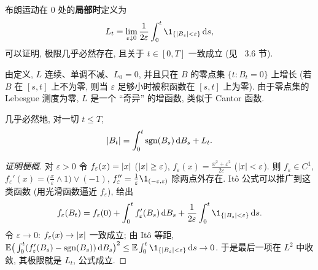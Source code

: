 \begin{definition}[局部时]\label{def:local-time}
布朗运动在 $0$ 处的\textbf{局部时}定义为
\[
L_t=\lim_{\varepsilon\downarrow0}\frac{1}{2\varepsilon}\int_0^t\1_{\{\abs{B_s}<\varepsilon\}}\dd s,
\]
可以证明, 极限几乎必然存在, 且关于 $t\in[0,T]$ 一致成立 (见~\cite{karatzas} 3.6 节).
\end{definition}

由定义, $L$ 连续、单调不减、$L_0=0$, 并且只在 $B$ 的零点集 $\{t: B_t=0\}$ 上增长 (若 $B$ 在 $[s,t]$ 上不为零, 则当 $\varepsilon$ 足够小时被积函数在 $[s,t]$ 上为零). 由于零点集的 Lebesgue 测度为零, $L$ 是一个 ``奇异'' 的增函数, 类似于 Cantor 函数.

\begin{theorem}[Tanaka 公式]\label{thm:tanaka}
几乎必然地, 对一切 $t\le T$,
\[
\lvert B_t\rvert=\int_0^t\operatorname{sgn}(B_s)\mathop{}\!\mathrm{d} B_s+L_t.
\]
\end{theorem}

\begin{proof}[证明梗概]
对 $\varepsilon>0$ 令 $f_\varepsilon(x)=\lvert x\rvert$ ($\lvert x\rvert\ge\varepsilon$), $f_\varepsilon(x)=\frac{x^2+\varepsilon^2}{2\varepsilon}$ ($\lvert x\rvert<\varepsilon$). 则 $f_\varepsilon\in C^1$, $f_\varepsilon'(x)=\big(\frac{x}{\varepsilon}\wedge1\big)\vee(-1)$, $f''_\varepsilon=\frac{1}{\varepsilon}\1_{(-\varepsilon,\varepsilon)}$ 除两点外存在. It\^o 公式可以推广到这类函数 (用光滑函数逼近 $f_\varepsilon$), 给出
\[
f_\varepsilon(B_t)=f_\varepsilon(0)+\int_0^tf'_\varepsilon(B_s)\dd B_s+\frac{1}{2\varepsilon}\int_0^t\1_{\{\abs{B_s}<\varepsilon\}}\dd s.
\]
令 $\varepsilon\to0$: $f_\varepsilon(x)\to\lvert x\rvert$ 一致成立; 由 It\^o 等距, $\E\big(\int_0^t(f'_\varepsilon(B_s)-\sgn(B_s))\dd B_s\big)^2\le\E\int_0^t\1_{\{\abs{B_s}<\varepsilon\}}\dd s\to0$. 于是最后一项在 $L^2$ 中收敛, 其极限就是 $L_t$, 公式成立.
\end{proof}

